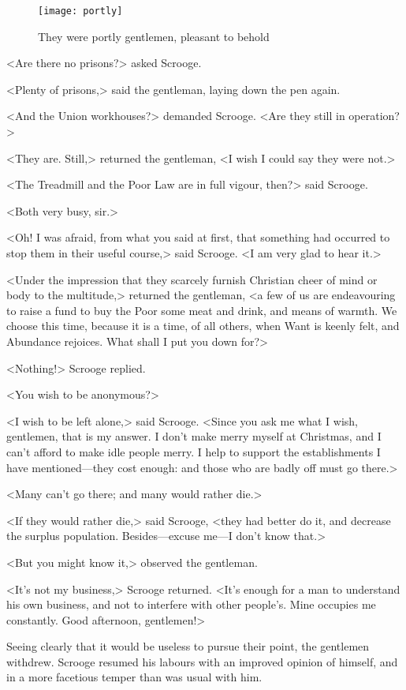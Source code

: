 \begin{figure}[tb]
\centering
  \texttt{[image: portly]}
  \caption{They were portly gentlemen, pleasant to behold}
\end{figure}

<Are there no prisons?> asked Scrooge.

<Plenty of prisons,> said the gentleman, laying down the pen again.

<And the Union workhouses?> demanded Scrooge. <Are they still in operation?>

<They are. Still,> returned the gentleman, <I wish I could say they were not.>

<The Treadmill and the Poor Law are in full vigour, then?> said Scrooge.

<Both very busy, sir.>

<Oh! I was afraid, from what you said at first, that something had occurred to stop them in their useful course,> said Scrooge. <I am very glad to hear it.>

<Under the impression that they scarcely furnish Christian cheer of mind or body to the multitude,> returned the gentleman, <a few of us are endeavouring to raise a fund to buy the Poor some meat and drink, and means of warmth. We choose this time, because it is a time, of all others, when Want is keenly felt, and Abundance rejoices. What shall I put you down for?>

<Nothing!> Scrooge replied.

<You wish to be anonymous?>

<I wish to be left alone,> said Scrooge. <Since you ask me what I wish, gentlemen, that is my answer. I don't make merry myself at Christmas, and I can't afford to make idle people merry. I help to support the establishments I have mentioned—they cost enough: and those who are badly off must go there.>

<Many can't go there; and many would rather die.>

<If they would rather die,> said Scrooge, <they had better do it, and decrease the surplus population. Besides—excuse me—I don't know that.>

<But you might know it,> observed the gentleman.

<It's not my business,> Scrooge returned. <It's enough for a man to understand his own business, and not to interfere with other people's. Mine occupies me constantly. Good afternoon, gentlemen!>

Seeing clearly that it would be useless to pursue their point, the gentlemen withdrew. Scrooge resumed his labours with an improved opinion of himself, and in a more facetious temper than was usual with him.

